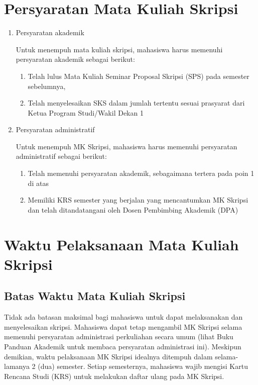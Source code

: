 \documentclass[
  indonesian,
  letterpaper,
]{scrbook}
\providecommand{\tightlist}{%
  \setlength{\itemsep}{0pt}\setlength{\parskip}{0pt}}
\begin{document}
\section{Persyaratan Mata Kuliah
Skripsi}\label{persyaratan-mata-kuliah-skripsi}

\begin{enumerate}
\def\labelenumi{\arabic{enumi}.}
\item
  Persyaratan akademik

  Untuk menempuh mata kuliah skripsi, mahasiswa harus memenuhi
  persyaratan akademik sebagai berikut:

  \begin{enumerate}
  \def\labelenumii{\alph{enumii}.}
  \tightlist
  \item
    Telah lulus Mata Kuliah Seminar Proposal Skripsi (SPS) pada semester
    sebelumnya,
  \item
    Telah menyelesaikan SKS dalam jumlah tertentu sesuai prasyarat dari
    Ketua Program Studi/Wakil Dekan 1
  \end{enumerate}
\item
  Persyaratan administratif

  Untuk menempuh MK Skripsi, mahasiswa harus memenuhi persyaratan
  administratif sebagai berikut:

  \begin{enumerate}
  \def\labelenumii{\alph{enumii}.}
  \item
    Telah memenuhi persyaratan akademik, sebagaimana tertera pada poin 1
    di atas
  \item
    Memiliki KRS semester yang berjalan yang mencantumkan MK Skripsi dan
    telah ditandatangani oleh Dosen Pembimbing Akademik (DPA)
  \end{enumerate}
\end{enumerate}

\section{Waktu Pelaksanaan Mata Kuliah
Skripsi}\label{waktu-pelaksanaan-mata-kuliah-skripsi}

\subsection*{Batas Waktu Mata Kuliah
Skripsi}\label{batas-waktu-mata-kuliah-skripsi}

Tidak ada batasan maksimal bagi mahasiswa untuk dapat melaksanakan dan
menyelesaikan skripsi. Mahasiswa dapat tetap mengambil MK Skripsi selama
memenuhi persyaratan administrasi perkuliahan secara umum (lihat Buku
Panduan Akademik untuk membaca persyaratan administrasi ini). Meskipun
demikian, waktu pelaksanaan MK Skripsi idealnya ditempuh dalam
selama-lamanya 2 (dua) semester. Setiap semesternya, mahasiswa wajib
mengisi Kartu Rencana Studi (KRS) untuk melakukan daftar ulang pada MK
Skripsi.
\end{document}
